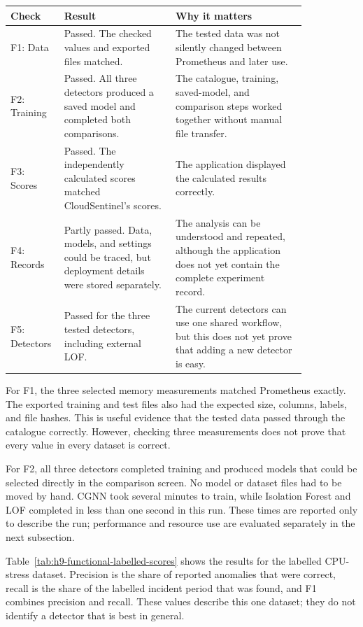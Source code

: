 \begin{center}
\small
\begin{tabular}{|p{0.10\linewidth}|p{0.34\linewidth}|p{0.40\linewidth}|}
\hline
Check & Result & Why it matters \\
\hline
F1: Data & Passed. The checked values and exported files matched. & The tested data was not silently changed between Prometheus and later use. \\
\hline
F2: Training & Passed. All three detectors produced a saved model and completed both comparisons. & The catalogue, training, saved-model, and comparison steps worked together without manual file transfer. \\
\hline
F3: Scores & Passed. The independently calculated scores matched CloudSentinel's scores. & The application displayed the calculated results correctly. \\
\hline
F4: Records & Partly passed. Data, models, and settings could be traced, but deployment details were stored separately. & The analysis can be understood and repeated, although the application does not yet contain the complete experiment record. \\
\hline
F5: Detectors & Passed for the three tested detectors, including external LOF. & The current detectors can use one shared workflow, but this does not yet prove that adding a new detector is easy. \\
\hline
\end{tabular}
\end{center}

For F1, the three selected memory measurements matched Prometheus exactly.
The exported training and test files also had the expected size, columns,
labels, and file hashes. This is useful evidence that the tested data passed
through the catalogue correctly. However, checking three measurements does
not prove that every value in every dataset is correct.

For F2, all three detectors completed training and produced models that could
be selected directly in the comparison screen. No model or dataset files had
to be moved by hand. CGNN took several minutes to train, while Isolation
Forest and LOF completed in less than one second in this run. These times are
reported only to describe the run; performance and resource use are evaluated
separately in the next subsection.

Table~\ref{tab:h9-functional-labelled-scores} shows the results for the
labelled CPU-stress dataset. Precision is the share of reported anomalies that
were correct, recall is the share of the labelled incident period that was
found, and F1 combines precision and recall. These values describe this one
dataset; they do not identify a detector that is best in general.

